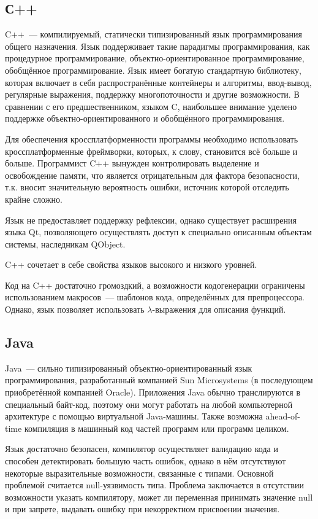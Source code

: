 \subsection{С++}
C++~--- компилируемый, статически типизированный язык программирования общего назначения. 
Язык поддерживает такие парадигмы программирования, как процедурное программирование, объектно-ориентированное программирование, обобщённое программирование. 
Язык имеет богатую стандартную библиотеку, которая включает в себя распространённые контейнеры и алгоритмы, ввод-вывод, регулярные выражения, поддержку многопоточности и другие возможности. 
В сравнении с его предшественником, языком C, наибольшее внимание уделено поддержке объектно-ориентированного и обобщённого программирования.

Для обеспечения кроссплатформенности программы необходимо использовать кроссплатформенные фреймворки, которых, к слову, становится всё больше и больше.
Программист C++ вынужден контролировать выделение и освобождение памяти, что является отрицательным для фактора безопасности, т.к. вносит значительную вероятность ошибки, источник которой отследить крайне сложно.

Язык не предоставляет поддержку рефлексии, однако существует расширения языка Qt, позволяющего осуществлять доступ к специально описанным объектам системы, наследникам QObject.

C++ сочетает в себе свойства языков высокого и низкого уровней.

Код на C++ достаточно громоздкий, а возможности кодогенерации ограничены использованием макросов~--- шаблонов кода, определённых для препроцессора. 
Однако, язык позволяет использовать $ \lambda $-выражения для описания функций.

\subsection{Java}

Java~--- сильно типизированный объектно-ориентированный язык программирования, разработанный компанией Sun Microsystems (в последующем приобретённой компанией Oracle). 
Приложения Java обычно транслируются в специальный байт-код, поэтому они могут работать на любой компьютерной архитектуре с помощью виртуальной Java-машины.
Также возможна ahead-of-time компиляция в машинный код частей программ или программ целиком.

Язык достаточно безопасен, компилятор осуществляет валидацию кода и способен детектировать большую часть ошибок, однако в нём отсутствуют некоторые выразительные возможности, связанные с типами. 
Основной проблемой считается null-уязвимость типа. 
Проблема заключается в отсутствии возможности указать компилятору, может ли переменная принимать значение null и при запрете, выдавать ошибку при некорректном присвоении значения.

